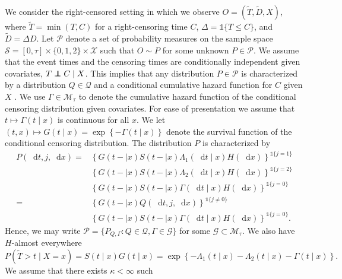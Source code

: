 \documentclass[a4paper,danish]{article}
\newcommand\independent{\protect\mathpalette{\protect\independenT}{\perp}}
\def\independenT#1#2{\mathrel{\rlap{$#1#2$}\mkern2mu{#1#2}}}
\newcommand*\diff{\mathop{}\!\mathrm{d}}
\newcommand{\1}{\mathds{1}}
\newcommand{\sample}{\ensuremath{\mathcal{S}}}
\theoremstyle{plain} %
\numberwithin{theorem}{section}
\theoremstyle{definition} %
\theoremstyle{remark}
\begin{document}
We consider the right-censored setting in which we observe \(O =
(\tilde{T},\tilde D, X)\), where $\tilde T = \min(T,C)$ for a
right-censoring time \(C\), $\Delta = \1{\{T \leq C\}}$, and \(\tilde
D=\Delta D\). Let \(\mathcal{P}\) denote a set of probability measures
on the sample space \(\sample = [0, \tau] \times \{0, 1, 2\}
\times \mathcal{X}\) such that \(O \sim P \) for some unknown \(P\in
\mathcal{P}\). We assume that the event times and the censoring times
are conditionally independent given covariates, \( T \independent C
\mid X \). This implies that any distribution \( P \in \mathcal{P} \)
is characterized by a distribution \( Q \in \mathcal{Q} \) and a
conditional cumulative hazard function for \( C \) given \( X \)
\citep[c.f.,][]{begun1983information,gill1997coarsening}. We use
\(\Gamma\in\mathcal{M}_{\tau}\) to denote the cumulative hazard
function of the conditional censoring distribution given
covariates. For ease of presentation we assume that \(t\mapsto
\Gamma(t \mid x) \) is continuous for all \( x \). We let
\((t,x)\mapsto G(t \mid x)=\exp\left\{-\Gamma(t \mid x)\right\}\)
denote the survival function of the conditional censoring
distribution. The distribution \( P \) is characterized by
\begin{equation}\label{eq:parametrizeP}
  \begin{split}
    P(\diff t, j, \diff x) =& \left\{G(t- \mid x)S(t- \mid x)\Lambda_1(\diff t \mid x)H(\diff x)\right\}^{\1{{\{j=1\}}}}\\
                            & \left\{G(t- \mid x)S(t- \mid x)\Lambda_2(\diff t \mid x)H(\diff x)\right\}^{\1{{\{j=2\}}}}\\
                            & \left\{G(t- \mid x)S(t- \mid x)\Gamma(\diff t \mid x)H(\diff x)\right\}^{\1{{\{j=0\}}}}\\
    = & \left\{G(t- \mid x)Q(\diff t,j,\diff x)\right\}^{\1{{\{j\ne 0\}}}}\\    
                            & \left\{G(t- \mid x)S(t- \mid x)\Gamma(\diff t \mid x)H(\diff x)\right\}^{\1{{\{j=0\}}}}.
  \end{split}
\end{equation}
Hence, we may write
\( \mathcal{P} = \{ P_{Q, \Gamma} : Q \in \mathcal{Q}, \Gamma \in
\mathcal{G} \} \) for some \( \mathcal{G} \subset \mathcal{M}_{\tau} \). We
also have \(H\)-almost everywhere
\begin{equation*}
P(\tilde T>t \mid X=x) = S(t \mid x)G(t \mid x) = \exp\left\{-\Lambda_{1}(t \mid x)-\Lambda_{2}(t \mid x)-\Gamma(t \mid x) \right\}.
\end{equation*} We assume that there exists \(\kappa<\infty\) such
\end{document}

